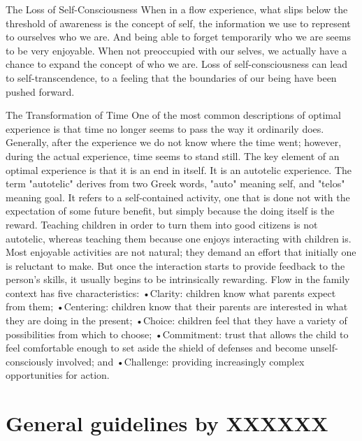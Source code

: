The Loss of Self-Consciousness
When in a flow experience, what slips below the threshold of awareness is the concept of self, the information we use to represent to ourselves who we are. And being able to forget temporarily who we are seems to be very enjoyable. When not preoccupied with our selves, we actually have a chance to expand the concept of who we are. Loss of self-consciousness can lead to self-transcendence, to a feeling that the boundaries of our being have been pushed forward.

The Transformation of Time
One of the most common descriptions of optimal experience is that time no longer seems to pass the way it ordinarily does. Generally, after the experience we do not know where the time went; however, during the actual experience, time seems to stand still.
The key element of an optimal experience is that it is an end in itself. It is an autotelic experience. The term "autotelic" derives from two Greek words, "auto" meaning self, and "telos" meaning goal. It refers to a self-contained activity, one that is done not with the expectation of some future benefit, but simply because the doing itself is the reward. Teaching children in order to turn them into good citizens is not autotelic, whereas teaching them because one enjoys interacting with children is. Most enjoyable activities are not natural; they demand an effort that initially one is reluctant to make. But once the interaction starts to provide feedback to the person's skills, it usually begins to be intrinsically rewarding.
Flow in the family context has five characteristics:
•Clarity: children know what parents expect from them; •Centering: children know that their parents are interested in what they are doing in the present;
•Choice: children feel that they have a variety of possibilities from which to choose;
•Commitment: trust that allows the child to feel comfortable enough to set aside the shield of defenses and become unself-consciously involved; and
•Challenge: providing increasingly complex opportunities for action.


\section{General guidelines by XXXXXX}

